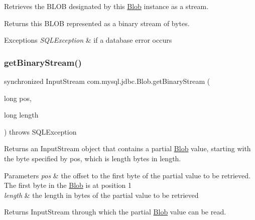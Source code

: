 Retrieves the B\+L\+OB designated by this \mbox{\hyperlink{classcom_1_1mysql_1_1jdbc_1_1_blob}{Blob}} instance as a stream.

\begin{DoxyReturn}{Returns}
this B\+L\+OB represented as a binary stream of bytes.
\end{DoxyReturn}

\begin{DoxyExceptions}{Exceptions}
{\em S\+Q\+L\+Exception} & if a database error occurs \\
\hline
\end{DoxyExceptions}
\mbox{\label{classcom_1_1mysql_1_1jdbc_1_1_blob_a5c5e58e0fee91fa04afad866e2c87289}} 
\subsubsection{\texorpdfstring{get\+Binary\+Stream()}{getBinaryStream()}\hspace{0.1cm}{\footnotesize\ttfamily [2/2]}}
{\footnotesize\ttfamily synchronized Input\+Stream com.\+mysql.\+jdbc.\+Blob.\+get\+Binary\+Stream (\begin{DoxyParamCaption}\item[{long}]{pos,  }\item[{long}]{length }\end{DoxyParamCaption}) throws S\+Q\+L\+Exception}

Returns an {\ttfamily Input\+Stream} object that contains a partial {\ttfamily \mbox{\hyperlink{classcom_1_1mysql_1_1jdbc_1_1_blob}{Blob}}} value, starting with the byte specified by pos, which is length bytes in length.


\begin{DoxyParams}{Parameters}
{\em pos} & the offset to the first byte of the partial value to be retrieved. The first byte in the {\ttfamily \mbox{\hyperlink{classcom_1_1mysql_1_1jdbc_1_1_blob}{Blob}}} is at position 1 \\
\hline
{\em length} & the length in bytes of the partial value to be retrieved \\
\hline
\end{DoxyParams}
\begin{DoxyReturn}{Returns}
{\ttfamily Input\+Stream} through which the partial {\ttfamily \mbox{\hyperlink{classcom_1_1mysql_1_1jdbc_1_1_blob}{Blob}}} value can be read. 
\end{DoxyReturn}

